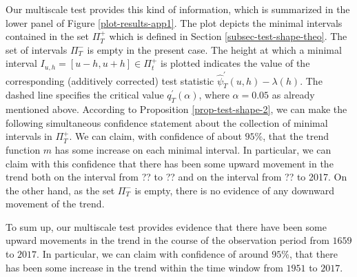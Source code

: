 Our multiscale test provides this kind of information, which is summarized in the lower panel of Figure \ref{plot-results-app1}. The plot depicts the minimal intervals contained in the set $\Pi_T^+$ which is defined in Section \ref{subsec-test-shape-theo}. The set of intervals $\Pi_T^-$ is empty in the present case. The height at which a minimal interval $I_{u,h} = [u-h,u+h] \in \Pi_t^+$ is plotted indicates the value of the corresponding (additively corrected) test statistic $\widehat{\psi}^\prime_T(u,h) - \lambda(h)$. The dashed line specifies the critical value $q_T^\prime(\alpha)$, where $\alpha = 0.05$ as already mentioned above. According to Proposition \ref{prop-test-shape-2}, we can make the following simultaneous confidence statement about the collection of minimal intervals in $\Pi_T^+$. We can claim, with confidence of about $95\%$, that the trend function $m$ has some increase on each minimal interval. In particular, we can claim with this confidence that there has been some upward movement in the trend both on the interval from ?? to ?? and on the interval from ?? to 2017. 
On the other hand, as the set $\Pi_T^-$ is empty, there is no evidence of any downward movement of the trend.  


To sum up, our multiscale test provides evidence that there have been some upward movements in the trend in the course of the observation period from $1659$ to $2017$. In particular, we can claim with confidence of around $95\%$, that there has been some increase in the trend within the time window from $1951$ to $2017$. 




